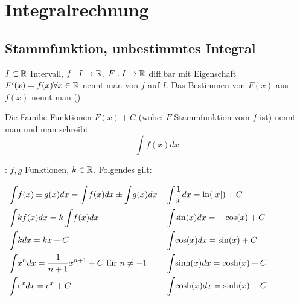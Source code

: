 \section{Integralrechnung}

\subsection{Stammfunktion, unbestimmtes Integral}

\Def $I \subset \mathbb{R}$ Intervall, $f: I \to \mathbb{R}$. $F: I \to \mathbb{R}$ diff.bar mit Eigenschaft
$F'(x) = f(x) \forall x \in \mathbb{R}$ nennt man  von $f$ auf $I$. Das 
Bestimmen von $F(x)$ aus $f(x)$ nennt man () 

\Def Die Familie Funktionen $F(x) + C$ (wobei $F$ Stammfunktion vom  $f$ ist)
nennt man  und man schreibt
$$\int f(x) dx$$

\Satz {}: $f,g$ Funktionen, $k \in \mathbb{R}$. Folgendes gilt:
\vspace{-0.6em}

\begin{tabular}{llll}
    $\displaystyle \int \hspace{-2pt} f(x) \pm g(x)dx = \int \hspace{-2pt} f(x) dx \pm \int \hspace{-2pt} g(x) dx$ & \hspace{-14pt}
    $\displaystyle \int \hspace{-2pt} \frac{1}{x} dx = \ln(|x|) + C$ \\
    
    $\displaystyle \int \hspace{-2pt} k f(x) dx = k \int \hspace{-2pt} f(x) dx$ & \hspace{-14pt}
    $\displaystyle \int \hspace{-2pt} \sin(x) dx = -\cos(x) + C$ \\
    
    $\displaystyle \int \hspace{-2pt} k dx = kx + C$ & \hspace{-14pt}
    $\displaystyle \int \hspace{-2pt} \cos(x) dx = \sin(x) + C$ \\
    
    $\displaystyle \int \hspace{-2pt} x^n dx = \frac{1}{n+1}x^{n+1} + C \text{ für } n \ne -1$ & \hspace{-14pt}
    $\displaystyle \int \hspace{-2pt} \sinh(x) dx = \cosh(x) + C$ \\
    
    $\displaystyle \int \hspace{-2pt} e^x dx = e^x + C$ & \hspace{-14pt}
    $\displaystyle \int \hspace{-2pt} \cosh(x) dx = \sinh(x) + C$
\end{tabular}

